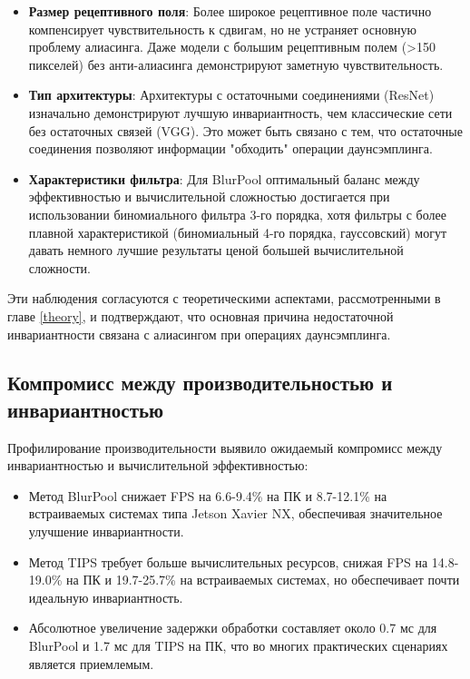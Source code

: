 \begin{itemize}
    \item \textbf{Размер рецептивного поля}: Более широкое рецептивное поле частично компенсирует чувствительность к сдвигам, но не устраняет основную проблему алиасинга. Даже модели с большим рецептивным полем (>150 пикселей) без анти-алиасинга демонстрируют заметную чувствительность.
    
    \item \textbf{Тип архитектуры}: Архитектуры с остаточными соединениями (ResNet) изначально демонстрируют лучшую инвариантность, чем классические сети без остаточных связей (VGG). Это может быть связано с тем, что остаточные соединения позволяют информации "обходить" операции даунсэмплинга.
    
    \item \textbf{Характеристики фильтра}: Для BlurPool оптимальный баланс между эффективностью и вычислительной сложностью достигается при использовании биномиального фильтра 3-го порядка, хотя фильтры с более плавной характеристикой (биномиальный 4-го порядка, гауссовский) могут давать немного лучшие результаты ценой большей вычислительной сложности.
\end{itemize}

Эти наблюдения согласуются с теоретическими аспектами, рассмотренными в главе \ref{theory}, и подтверждают, что основная причина недостаточной инвариантности связана с алиасингом при операциях даунсэмплинга.

\subsection{Компромисс между производительностью и инвариантностью}
\label{discussion:synthesis:tradeoff}

Профилирование производительности выявило ожидаемый компромисс между инвариантностью и вычислительной эффективностью:

\begin{itemize}
    \item Метод BlurPool снижает FPS на 6.6-9.4\% на ПК и 8.7-12.1\% на встраиваемых системах типа Jetson Xavier NX, обеспечивая значительное улучшение инвариантности.
    
    \item Метод TIPS требует больше вычислительных ресурсов, снижая FPS на 14.8-19.0\% на ПК и 19.7-25.7\% на встраиваемых системах, но обеспечивает почти идеальную инвариантность.
    
    \item Абсолютное увеличение задержки обработки составляет около 0.7 мс для BlurPool и 1.7 мс для TIPS на ПК, что во многих практических сценариях является приемлемым.
\end{itemize}

